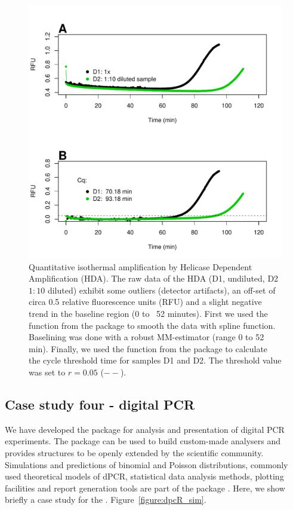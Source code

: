 \begin{figure}[htbp]
  \centering
  \includegraphics[clip=true, width=16cm]{figures/qIA.pdf}
  \caption{Quantitative isothermal amplification by Helicase Dependent 
Amplification (HDA).  The raw data of the HDA (D1, undiluted, D2 
$1:10$ diluted) exhibit some outliers (detector artifacts), an off-set of circa 
0.5 relative fluorescence units (RFU) and a slight negative trend in the 
baseline region (0 to ~52 minutes).  First we used the  
function from the  package to smooth the data with spline 
function. Baselining was done with a robust MM-estimator (range 0 to 52 min). 
Finally, we used the  function from the  package 
to calculate the cycle threshold time for samples D1 and D2. The threshold 
value 
was set to $r = 0.05$ ($--$).}
  \label{figure:qIA}
\end{figure}

\subsection{Case study four - digital PCR}

We have developed the  package for analysis and presentation of 
digital PCR experiments. The  package can be used to build 
custom-made analysers and provides structures to be openly extended by the 
scientific community. Simulations and predictions of binomial and Poisson 
distributions, commonly used theoretical models of dPCR, statistical data 
analysis methods, plotting facilities and report generation tools are part of 
the package \citep{pabinger_2014}. Here, we show briefly a case study for the 
. Figure~\ref{figure:dpcR_sim}.

